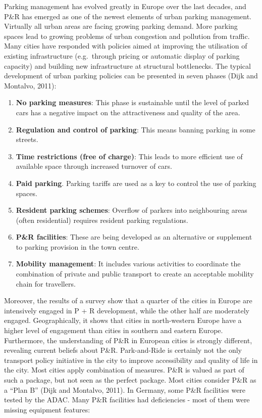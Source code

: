 \documentclass[
]{book}
\providecommand{\tightlist}{%
  \setlength{\itemsep}{0pt}\setlength{\parskip}{0pt}}
\begin{document}
Parking management has evolved greatly in Europe over the last decades, and P\&R has emerged as one of the newest elements of urban parking management. Virtually all urban areas are facing growing parking demand. More parking spaces lead to growing problems of urban congestion and pollution from traffic. Many cities have responded with policies aimed at improving the utilisation of existing infrastructure (e.g.~through pricing or automatic display of parking capacity) and building new infrastructure at structural bottlenecks. The typical development of urban parking policies can be presented in seven phases (Dijk and Montalvo, 2011):

\begin{enumerate}
\def\labelenumi{\arabic{enumi}.}
\tightlist
\item
  \textbf{No parking measures}: This phase is sustainable until the level of parked cars has a negative impact on the attractiveness and quality of the area.
\item
  \textbf{Regulation and control of parking}: This means banning parking in some streets.
\item
  \textbf{Time restrictions (free of charge)}: This leads to more efficient use of available space through increased turnover of cars.
\item
  \textbf{Paid parking}. Parking tariffs are used as a key to control the use of parking spaces.
\item
  \textbf{Resident parking schemes}: Overflow of parkers into neighbouring areas (often residential) requires resident parking regulations.
\item
  \textbf{P\&R facilities}: These are being developed as an alternative or supplement to parking provision in the town centre.
\item
  \textbf{Mobility management}: It includes various activities to coordinate the combination of private and public transport to create an acceptable mobility chain for travellers.
\end{enumerate}

Moreover, the results of a survey show that a quarter of the cities in Europe are intensively engaged in P + R development, while the other half are moderately engaged. Geographically, it shows that cities in north-western Europe have a higher level of engagement than cities in southern and eastern Europe. Furthermore, the understanding of P\&R in European cities is strongly different, revealing current beliefs about P\&R.
Park-and-Ride is certainly not the only transport policy initiative in the city to improve accessibility and quality of life in the city. Most cities apply combination of measures. P\&R is valued as part of such a package, but not seen as the perfect package. Most cities consider P\&R as a ``Plan B'' (Dijk and Montalvo, 2011).
In Germany, some P\&R facilities were tested by the ADAC. Many P\&R facilities had deficiencies - most of them were missing equipment features:
\end{document}

